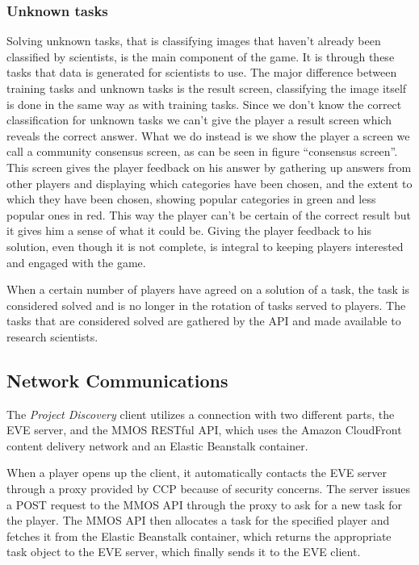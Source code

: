 \subsubsection{Unknown tasks}
Solving unknown tasks, that is classifying images that haven't already been classified by scientists, is the main component of the game. It is through these tasks that data is generated for scientists to use. The major difference between training tasks and unknown tasks is the result screen, classifying the image itself is done in the same way as with training tasks. Since we don't know the correct classification for unknown tasks we can't give the player a result screen which reveals the correct answer. What we do instead is we show the player a screen we call a community consensus screen, as can be seen in figure ``consensus screen''. This screen gives the player feedback on his answer by gathering up answers from other players and displaying which categories have been chosen, and the extent to which they have been chosen, showing popular categories in green and less popular ones in red. This way the player can't be certain of the correct result but it gives him a sense of what it could be. Giving the player feedback to his solution, even though it is not complete, is integral to keeping players interested and engaged with the game.

When a certain number of players have agreed on a solution of a task, the task is considered solved and is no longer in the rotation of tasks served to players. The tasks that are considered solved are gathered by the API and made available to research scientists.


\subsection{Network Communications}
The \emph{Project Discovery} client utilizes a connection with two different parts, the EVE server, and the MMOS RESTful API, which uses the Amazon CloudFront content delivery network and an Elastic Beanstalk container.

When a player opens up the client, it automatically contacts the EVE server through a proxy provided by CCP because of security concerns. The server issues a POST request to the MMOS API through the proxy to ask for a new task for the player. The MMOS API then allocates a task for the specified player and fetches it from the Elastic Beanstalk container, which returns the appropriate task object to the EVE server, which finally sends it to the EVE client. 

